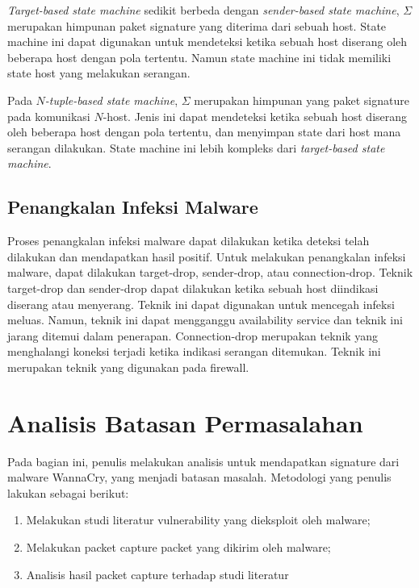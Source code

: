 \textit{Target-based state machine} sedikit berbeda dengan \textit{sender-based state machine}, $\Sigma$ merupakan himpunan paket signature yang diterima dari sebuah host. State machine ini dapat digunakan untuk mendeteksi ketika sebuah host diserang oleh beberapa host dengan pola tertentu. Namun state machine ini tidak memiliki state host yang melakukan serangan.

Pada \textit{$N$-tuple-based state machine}, $\Sigma$ merupakan himpunan yang paket signature pada komunikasi $N$-host. Jenis ini dapat mendeteksi ketika sebuah host diserang oleh beberapa host dengan pola tertentu, dan menyimpan state dari host mana serangan dilakukan. State machine ini lebih kompleks dari \textit{target-based state machine}.

\subsection{Penangkalan Infeksi Malware}

Proses penangkalan infeksi malware dapat dilakukan ketika deteksi telah dilakukan dan mendapatkan hasil positif. Untuk melakukan penangkalan infeksi malware, dapat dilakukan target-drop, sender-drop, atau connection-drop. Teknik target-drop dan sender-drop dapat dilakukan ketika sebuah host diindikasi diserang atau menyerang. Teknik ini dapat digunakan untuk mencegah infeksi meluas. Namun, teknik ini dapat mengganggu availability service dan teknik ini jarang ditemui dalam penerapan. Connection-drop merupakan teknik yang menghalangi koneksi terjadi ketika indikasi serangan ditemukan. Teknik ini merupakan teknik yang digunakan pada firewall.

\section{Analisis Batasan Permasalahan}

Pada bagian ini, penulis melakukan analisis untuk mendapatkan signature dari malware WannaCry, yang menjadi batasan masalah. Metodologi yang penulis lakukan sebagai berikut:

\begin{enumerate}
	\item {Melakukan studi literatur vulnerability yang dieksploit oleh malware;}
	\item {Melakukan packet capture packet yang dikirim oleh malware;}
	\item {Analisis hasil packet capture terhadap studi literatur}
\end{enumerate}

